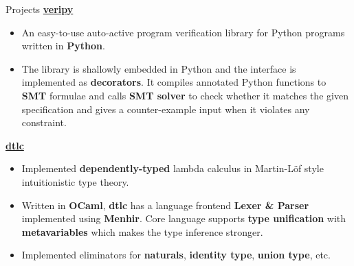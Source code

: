 \documentclass{resume}
\begin{document}
\begin{rSection}{Projects}
		\textbf{\href{https://github.com/AD1024/veripy}{veripy}} %
		\vspace{-5pt}

		\begin{itemize}
			\setlength{\itemsep}{1pt}
            \setlength{\parskip}{0pt}
			\setlength{\parsep}{0pt}
			\item An easy-to-use auto-active program verification library for Python programs written in \textbf{Python}.
			\item The library is shallowly embedded in Python and the interface is implemented as \textbf{decorators}. It compiles annotated Python functions to \textbf{SMT} formulae and calls \textbf{SMT solver} to check whether it matches the given specification and gives a counter-example input when it violates any constraint.
		\end{itemize}

		\textbf{\href{https://github.com/AD1024/dtlc}{dtlc}} %
		\vspace{-5pt}

		\begin{itemize}
			\setlength{\itemsep}{1pt}
            \setlength{\parskip}{0pt}
			\setlength{\parsep}{0pt}
			\item Implemented \textbf{dependently-typed} lambda calculus in Martin-Löf style intuitionistic type theory.
			\item Written in \textbf{OCaml}, \textbf{dtlc} has a language frontend \textbf{Lexer \& Parser} implemented using \textbf{Menhir}. Core language supports \textbf{type unification} with \textbf{metavariables} which makes the type inference stronger.
			\item Implemented eliminators for \textbf{naturals}, \textbf{identity type}, \textbf{union type}, etc.
		\end{itemize}


\end{rSection}
\end{document}

